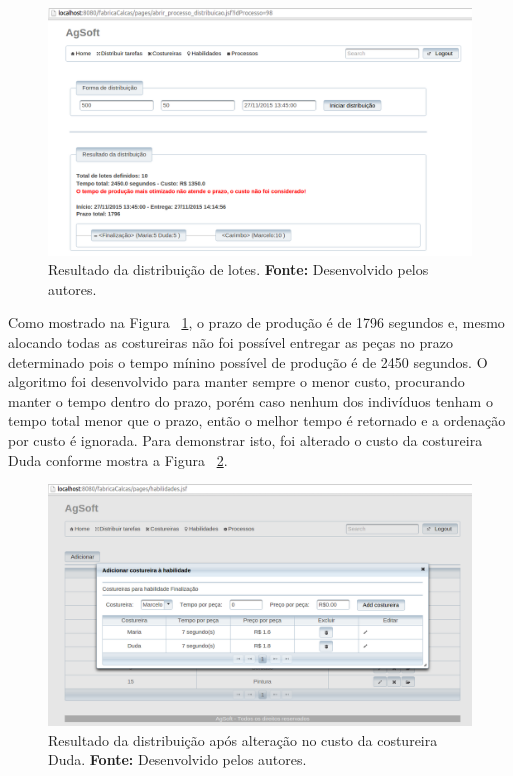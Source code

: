 \begin{figure}[h!]
	\centerline{\includegraphics[scale=0.3]{./imagens/resultado1_teste6.png}}
	\caption[Resultado da distribuição de lotes.] 
	{Resultado da distribuição de lotes. \textbf{Fonte:} Desenvolvido pelos
	autores.}
	\label{fig:resultado1_teste6}
\end{figure}

\par Como mostrado na Figura ~\ref{fig:resultado1_teste6}, o prazo de produção
é de 1796 segundos e, mesmo alocando todas as costureiras não foi possível
entregar as peças no prazo determinado pois o tempo mínino possível de produção
é de 2450 segundos. O algoritmo foi desenvolvido para manter sempre o menor custo, procurando manter o tempo
dentro do prazo, porém caso nenhum dos indivíduos tenham o tempo total menor que o prazo,
então o melhor tempo é retornado e a ordenação por custo é ignorada. Para
demonstrar isto, foi alterado o custo da costureira Duda conforme mostra a Figura ~\ref{fig:alterecao_custotcseis}.
 

\begin{figure}[h!]
	\centerline{\includegraphics[scale=0.3]{./imagens/alterecao_custo_teste6.png}}
	\caption[Alteração no custo das costureiras da habilidade Finalização.] 
	{Resultado da distribuição após alteração no custo da costureira Duda. \textbf{Fonte:} Desenvolvido pelos
		autores.}
	\label{fig:alterecao_custotcseis}
\end{figure}


